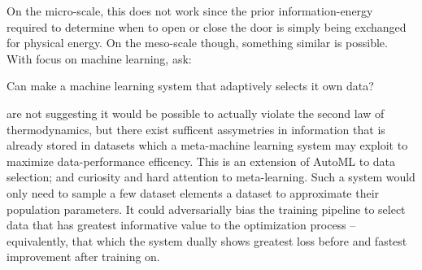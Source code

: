 On the micro-scale, this does not work since the prior information-energy required to determine when to open or close the door is simply being exchanged for physical energy. On the meso-scale though, something similar is possible. With focus on machine learning, \we ask:
\begin{center}
 Can \we make a machine learning system that adaptively selects it own data?
\end{center}
\We are not suggesting it would be possible to actually violate the second law of thermodynamics, but there exist sufficent assymetries in information that is already stored in datasets which a meta-machine learning system may exploit to maximize data-performance efficency. This is an extension of AutoML to data selection; and curiosity and hard attention to meta-learning. Such a system would only need to sample a few dataset elements a dataset to approximate their population parameters. It could adversarially bias the training pipeline to select data that has greatest informative value to the optimization process -- equivalently, that which the system dually shows greatest loss before and fastest improvement after training on.  
